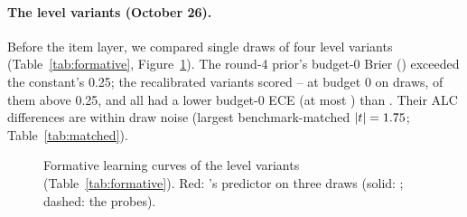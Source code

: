 \documentclass{article}
\begin{document}
\paragraph{The level variants (October 26).} Before the item layer, we compared single draws of four level variants (Table~\ref{tab:formative}, Figure~\ref{fig:formative}). The round-4 prior's budget-0 Brier (\FmShipBZero) exceeded the constant's 0.25; the recalibrated variants scored \SdRecalBZeroMin--\SdRecalBZeroMax{} at budget 0 on \SdRecalNRuns{} draws, \SdRecalNAbove{} of them above 0.25, and all had a lower budget-0 ECE (at most \SdRecalEceBZeroMax) than \FmShipEceBZero. Their ALC differences are within draw noise (largest benchmark-matched $|t|=1.75$; Table~\ref{tab:matched}).

\begin{table}[htbp]
\caption{Formative runs of the level variants (October 26; means over pairs). Each run is a fresh draw on the same \FmNBenchAll{} hidden benchmarks, so rows are not paired comparisons. \SdDrawTwoId{} and \SdDrawThreeId{} are deployment probes returning \SelId's predictions. ECE: budget-weighted summary ECE; ECE$_0$: at budget 0.}
\label{tab:formative}
\centering\footnotesize\setlength{\tabcolsep}{3pt}
\end{table}

\begin{figure}[htbp]
\centering
{}
\caption{Formative learning curves of the level variants (Table~\ref{tab:formative}). Red: \SelId's predictor on three draws (solid: \SelId; dashed: the probes).}
\label{fig:formative}
\end{figure}
\end{document}
